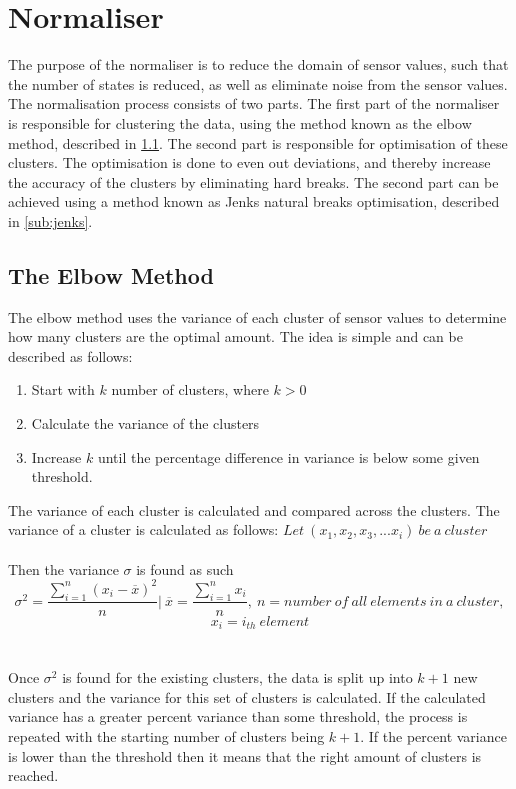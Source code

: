 \section{Normaliser}
\label{sec:normaliser}
The purpose of the normaliser is to reduce the domain of sensor values, such that the number of states is reduced, as well as eliminate noise from the sensor values. The normalisation process consists of two parts. The first part of the normaliser is responsible for clustering the data, using the method known as the elbow method, described in \cref{sub:elbow_method}. The second part is responsible for optimisation of these clusters. The optimisation is done to even out deviations, and thereby increase the accuracy of the clusters by eliminating hard breaks. The second part can be achieved using a method known as Jenks natural breaks optimisation, described in \cref{sub:jenks}.

\subsection{The Elbow Method}
\label{sub:elbow_method}
The elbow method uses the variance of each cluster of sensor values to determine how many clusters are the optimal amount. The idea is simple and can be described as follows:
\begin{enumerate}
\item Start with $k$ number of clusters, where $k>0$
\item Calculate the variance of the clusters
\item Increase $k$ until the percentage difference in variance is below some given threshold.
\end{enumerate}
The variance of each cluster is calculated and compared across the clusters. The variance of a cluster is calculated as follows:
$Let\ (x_1,x_2,x_3,...x_i) \ be \ a\ cluster $
\\\\Then the variance $\sigma$ is found as such
$$\sigma^2 = \frac{\displaystyle\sum_{i = 1}^{n}(x_{i}-\overline{x})^2 }{n} \Biggr\rvert\ \overline{x}  =\frac{\displaystyle\sum_{i=1}^{n}x_{i}}{n},\ n =number\ of\ all\ elements\ in\ a\ cluster ,$$
$$ x_{i} = i_{th}\ element $$
\\\\
Once $\sigma^2$ is found for the existing clusters, the data is split up into $k+1$ new clusters and the variance for this set of clusters is calculated. If the calculated variance has a greater percent variance than some threshold, the process is repeated with the starting number of clusters being $k+1$. If the percent variance is lower than the threshold then it means that the right amount of clusters is reached.
